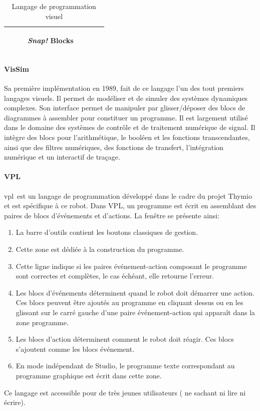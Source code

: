 \begin{table}[!h]
\begin{tabular}{|c|c|}
\begin{subfigure}{0.35\linewidth}
               \caption{\label{tab:Snap}\textit{Snap!} Blocks}
               \strut
               \end{subfigure}
                \\ \hline
            \end{tabular}
            \caption{Langage de programmation visuel}\label{tab:langue}
            \end{table}
            \paragraph{VisSim}
                Sa première implémentation en 1989, fait de ce langage l'un des tout premiers langages visuels.
                Il permet de modéliser et de simuler des systèmes dynamiques complexes. Son interface permet de manipuler par glisser/déposer des blocs de diagrammes à assembler pour constituer un programme. Il est largement utilisé dans le domaine des systèmes de contrôle et de traitement numérique de signal. Il intègre des blocs pour l’arithmétique, le booléen et les fonctions transcendantes, ainsi que des filtres numériques, des fonctions de transfert, l’intégration numérique et un interactif de traçage.
            \paragraph{VPL}\label{sec:VPL}
                \glsdesc{vpl}~est un langage de programmation développé dans le cadre du projet Thymio et est spécifique à ce robot.
                Dans VPL, un programme est écrit en assemblant des paires de blocs d'événements et d'actions. La fenêtre se présente ainsi:
                \begin{enumerate}\myItemStyle
                    \item La barre d'outils contient les boutons classiques de gestion.
                    \item Cette zone est dédiée à la construction du programme.
                    \item Cette ligne indique si les paires événement-action composant le programme sont correctes et complètes, le cas échéant, elle retourne l'erreur.
                    \item Les blocs d'événements déterminent quand le robot doit démarrer une action. Ces blocs peuvent être ajoutés au programme en cliquant dessus ou en les glissant sur le carré gauche d'une paire événement-action qui apparaît dans la zone programme.
                    \item Les blocs d'action déterminent comment le robot doit réagir. Ces blocs s'ajoutent comme les blocs événement.
                    \item En mode indépendant de Studio, le programme texte correspondant au programme graphique est écrit dans cette zone.
                \end{enumerate}{}
                Ce langage est accessible pour de très jeunes utilisateurs ( \eg ne sachant ni lire ni écrire).
